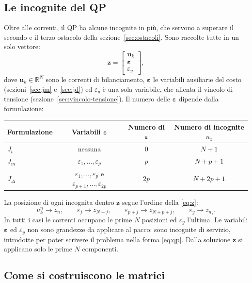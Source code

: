 \documentclass[11pt,a4paper]{article}
\newcommand{\vett}[1]{\boldsymbol{#1}}      %
\begin{document}
\subsection{Le incognite del QP}

Oltre alle correnti, il QP ha alcune incognite in più, che servono a superare
il secondo e il terzo ostacolo della sezione~\ref{sec:ostacoli}. Sono raccolte
tutte in un solo vettore:
\begin{equation}
  \vett{z} = \begin{bmatrix} \vett{u}_k \\ \vett{\varepsilon} \\ \varepsilon_y \end{bmatrix} ,
  \label{eq:z}
\end{equation}
dove $\vett{u}_k \in \mathbb{R}^N$ sono le correnti di bilanciamento, $\vett{\varepsilon}$ le
variabili ausiliarie del costo (sezioni~\ref{sec:jm} e~\ref{sec:jd}) ed $\varepsilon_y$ è
una sola variabile, che allenta il vincolo di tensione
(sezione~\ref{sec:vincolo-tensione}). Il numero delle $\vett{\varepsilon}$ dipende
dalla formulazione:

\begin{center}
\begin{tabular}{lccc}
\toprule
Formulazione & Variabili $\vett{\varepsilon}$ & Numero di $\vett{\varepsilon}$ & Numero di incognite $n_z$ \\
\midrule
$J_t$ & nessuna & 0 & $N + 1$ \\
$J_m$ & $\varepsilon_1, \dots, \varepsilon_p$ & $p$ & $N + p + 1$ \\
$J_\Delta$ & $\varepsilon_1, \dots, \varepsilon_p$ e $\varepsilon_{p+1}, \dots, \varepsilon_{2p}$ & $2p$ & $N + 2p + 1$ \\
\bottomrule
\end{tabular}
\end{center}

\noindent
La posizione di ogni incognita dentro $\vett{z}$ segue l'ordine della
\eqref{eq:z}:
\[
  u^n_k \to z_n , \qquad
  \varepsilon_j \to z_{N+j} , \qquad
  \varepsilon_{p+j} \to z_{N+p+j} , \qquad
  \varepsilon_y \to z_{n_z} .
\]
In tutti i casi le correnti occupano le prime $N$ posizioni ed $\varepsilon_y$ l'ultima.
Le variabili $\vett{\varepsilon}$ ed $\varepsilon_y$ non sono grandezze da applicare al pacco:
sono incognite di servizio, introdotte per poter scrivere il problema nella
forma \eqref{eq:qp}. Dalla soluzione $\vett{z}$ si applicano solo le prime $N$
componenti.

\subsection{Come si costruiscono le matrici}\label{sec:metodo}
\end{document}
